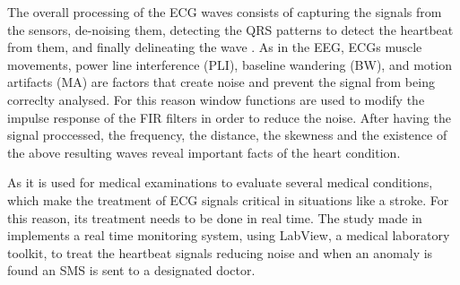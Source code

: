 The overall processing of the ECG waves consists of capturing the signals from the sensors, de-noising them, detecting the QRS patterns to detect the heartbeat from them, and finally delineating the wave \cite{ECGsignalprocc}.
As in the EEG, ECGs muscle movements, power line interference (PLI), baseline wandering (BW), and motion artifacts (MA) are factors that create noise and prevent the signal from being correclty analysed. For this reason window functions are used to modify the impulse response of the FIR filters in order to reduce the noise.  After having the signal proccessed, the frequency, the distance, the skewness and the existence of the above resulting waves reveal important facts of the heart condition.


As it is used for medical examinations to evaluate several medical conditions, which make the treatment of ECG signals critical in situations like a stroke. For this reason, its treatment needs to be done in real time. The study made in \cite{ECGsyc} implements a real time monitoring system, using LabView, a medical laboratory toolkit, to treat the heartbeat signals reducing noise and when an anomaly is found an SMS is sent to a designated doctor.